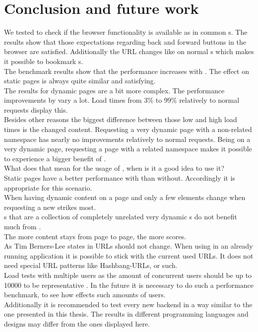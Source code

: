 \section{Conclusion and future work\label{chap:conclusion}}

We tested \lare{} to check if the browser functionality is available as in common \webApplication{}s.
The results show that those expectations regarding back and forward buttons in the browser are satisfied.
Additionally the URL changes like on normal \webApplication{}s which makes it possible to bookmark \webPage{}s.
\\
The benchmark results show that the performance increases with \lare{}.
The effect on static pages is always quite similar and satisfying.
\\
The results for dynamic pages are a bit more complex.
The performance improvements by \lare{} vary a lot.
Load times from 3\% to 99\% relatively to normal requests display this.
\\
Besides other reasons the biggest difference between those low and high load times is the changed content.
Requesting a very dynamic page with a non-related namespace has nearly no improvements relatively to normal requests.
Being on a very dynamic page, requesting a page with a related namespace makes it possible to experience a bigger benefit of \lare{}.
\\
What does that mean for the usage of \lare{}, when is it a good idea to use it?
\\
Static pages have a better performance with \lare{} than without.
Accordingly it is appropriate for this scenario.
\\
When having dynamic content on a page and only a few elements change when requesting a new \webPage{} \lare{} strikes most.
\\
\WebSite{}s that are a collection of completely unrelated very dynamic \webPage{}s do not benefit much from \lare{}.
\\
The more content stays from page to page, the more \lare{} scores.
\\
As Tim Berners-Lee states in \cite{berners1998cool} URLs should not change.
When using \lare{} in an already running application it is possible to stick with the current used URLs.
It does not need special URL patterns like Hashbang-URLs, or such.
\\
Load tests with multiple users as the amount of concurrent users should be up to 10000 to be representative \cite{bozdag2008performance}.
In the future it is necessary to do such a performance benchmark, to see how \lare{} effects such amounts of users.
\\
Additionally it is recommended to test every new \lare{} backend in a way similar to the one presented in this thesis.
The results in different programming languages and \webApplication{} designs may differ from the ones displayed here.
